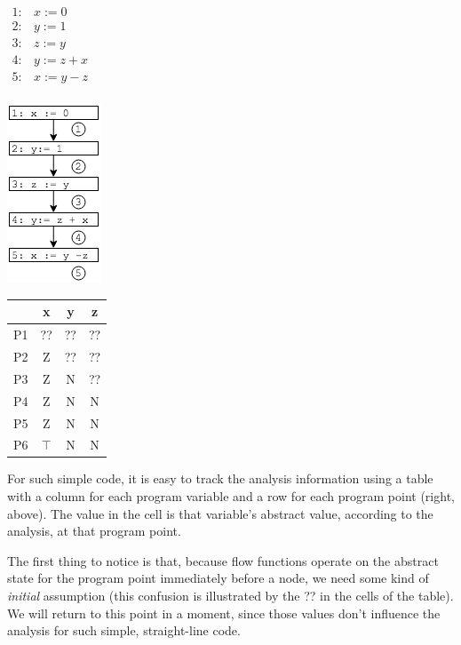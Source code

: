 \documentclass[11pt]{article}
\begin{document}
\begin{center}
\begin{minipage}[t][-9.7em][b]{0.30\textwidth} %
 $\begin{array}{ll}
 1: & x := 0\\
 2: & y := 1\\
 3: & z := y\\
 4: & y := z + x\\
 5: & x := y - z\\
\end{array}$
\end{minipage}
\hspace*{1em}%
\includegraphics[scale=0.75]{images/df-notes-cfg}
\hspace*{3em}
\begin{minipage}[t][-9.7em][b]{0.30\textwidth} %
\begin{tabular}{r | c c c}
  & x & y & z \\
\hline
P1 & ?? & ?? & ?? \\
P2 & Z & ??  & ?? \\
P3 & Z & N & ?? \\
P4 & Z & N & N\\
P5 & Z & N & N\\
P6 & $\top$ & N & N\\
\end{tabular}
\end{minipage}
\end{center}

For such simple code, it is easy to track the analysis information using a table with a
column for each program variable and a row for each program point (right,
above). The value in the cell is that variable's abstract value, according to
the analysis, at that program point.

The first thing to notice is that, because flow functions operate on the
abstract state for the program point immediately before a node, we need some
kind of \emph{initial} assumption (this confusion is illustrated by the ?? in
the cells of the table).  We will return to this point in a moment, since those
values don't influence the analysis for such simple, straight-line code. 
\end{document}
